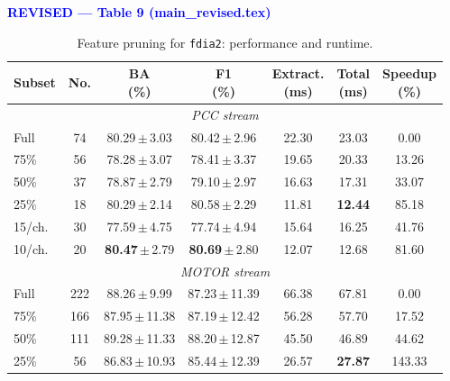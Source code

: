 \documentclass[letterpaper,journal]{IEEEtran}
\begin{document}
\begin{table}[p]
\begin{adjustbox}{max width=\textwidth,max totalheight=0.87\textheight}
\begin{minipage}{\textwidth}
\begin{minipage}[t]{0.48\textwidth}
\end{minipage}\hfill%
\begin{minipage}[t]{0.48\textwidth}
\centering
\textcolor{blue}{\textbf{REVISED --- Table 9 (main\_revised.tex)}}\par\smallskip

\centering
\scriptsize
\caption{Feature pruning for \texttt{fdia2}: performance and runtime.}
\label{tab:feature_pruning_anomaly2_runtime}
\renewcommand{\arraystretch}{1.15}
\setlength{\tabcolsep}{1.7pt}
\begin{tabular}{@{}lcccccc@{}}
\hline
Subset & No. & \shortstack{BA\\(\%)} & \shortstack{F1\\(\%)} & \shortstack{Extract.\\(ms)} & \shortstack{Total\\(ms)} & \shortstack{Speedup\\(\%)} \\\hline
\hline\multicolumn{7}{c}{\textit{PCC stream}} \\\hline
Full & 74 & \mbox{80.29\,$\pm$\,3.03} & \mbox{80.42\,$\pm$\,2.96} & 22.30 & 23.03 & 0.00 \\
75\% & 56 & \mbox{78.28\,$\pm$\,3.07} & \mbox{78.41\,$\pm$\,3.37} & 19.65 & 20.33 & 13.26 \\
50\% & 37 & \mbox{78.87\,$\pm$\,2.79} & \mbox{79.10\,$\pm$\,2.97} & 16.63 & 17.31 & 33.07 \\
25\% & 18 & \mbox{80.29\,$\pm$\,2.14} & \mbox{80.58\,$\pm$\,2.29} & 11.81 & \textbf{12.44} & 85.18 \\
15/ch. & 30 & \mbox{77.59\,$\pm$\,4.75} & \mbox{77.74\,$\pm$\,4.94} & 15.64 & 16.25 & 41.76 \\
10/ch. & 20 & \mbox{\textbf{80.47}\,$\pm$\,2.79} & \mbox{\textbf{80.69}\,$\pm$\,2.80} & 12.07 & 12.68 & 81.60 \\
\hline\multicolumn{7}{c}{\textit{MOTOR stream}} \\\hline
Full & 222 & \mbox{88.26\,$\pm$\,9.99} & \mbox{87.23\,$\pm$\,11.39} & 66.38 & 67.81 & 0.00 \\
75\% & 166 & \mbox{87.95\,$\pm$\,11.38} & \mbox{87.19\,$\pm$\,12.42} & 56.28 & 57.70 & 17.52 \\
50\% & 111 & \mbox{89.28\,$\pm$\,11.33} & \mbox{88.20\,$\pm$\,12.87} & 45.50 & 46.89 & 44.62 \\
25\% & 56 & \mbox{86.83\,$\pm$\,10.93} & \mbox{85.44\,$\pm$\,12.39} & 26.57 & \textbf{27.87} & 143.33 \\

\end{tabular}
\end{minipage}
\end{minipage}
\end{adjustbox}
\end{table}
\end{document}
